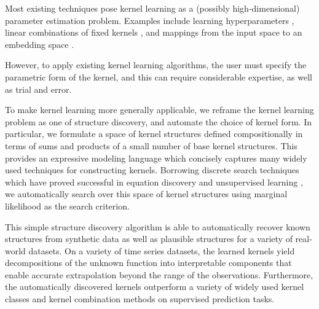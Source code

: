 Most existing techniques pose kernel learning as a (possibly high-dimensional) parameter estimation problem.
Examples include learning hyperparameters \citep{rasmussen38gaussian}, linear combinations of fixed kernels \cite{Bach_HKL}, and mappings from the input space to an embedding space \cite{salakhutdinov2008using}.

However, to apply existing kernel learning algorithms, the user must specify the parametric form of the kernel, and this can require considerable expertise, as well as trial and error.

To make kernel learning more generally applicable, we reframe the kernel learning problem as one of structure discovery, and automate the choice of kernel form.
In particular, we formulate a space of kernel structures defined compositionally in terms of sums and products of a small number of base kernel structures.
This provides an expressive modeling language which concisely captures many widely used techniques for constructing kernels.
Borrowing discrete search techniques which have proved successful in equation discovery \cite{todorovski1997declarative} and unsupervised learning \cite{grosse2012exploiting}, we automatically search over this space of kernel structures using marginal likelihood as the search criterion.

This simple structure discovery algorithm is able to automatically recover known structures from synthetic data as well as plausible structures for a variety of real-world datasets. 
On a variety of time series datasets, the learned kernels yield decompositions of the unknown function into interpretable components that enable accurate extrapolation beyond the range of the observations.
Furthermore, the automatically discovered kernels outperform a variety of widely used kernel classes and kernel combination methods on supervised prediction tasks.



